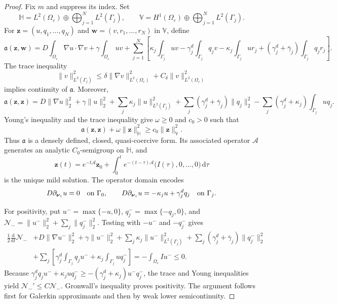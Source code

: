 \documentclass[pdflatex,sn-mathphys-num]{sn-jnl}
\numberwithin{equation}{section}
\theoremstyle{thmstyleone}%
\theoremstyle{definition}
\theoremstyle{remark}
\begin{document}
\begin{appendices}
\begin{proof}
Fix $m$ and suppress its index. Set
\[
\mathbb H=L^2(\Omega_\varepsilon)\oplus
\bigoplus_{j=1}^N L^2(\Gamma_j),\qquad
\mathbb V=H^1(\Omega_\varepsilon)\oplus
\bigoplus_{j=1}^N L^2(\Gamma_j).
\]
For $\mathbf z=(u,q_1,\ldots,q_N)$ and
$\mathbf w=(v,r_1,\ldots,r_N)$ in $\mathbb V$, define
\begin{equation}
\mathfrak a(\mathbf z,\mathbf w)
=D\int_{\Omega_\varepsilon}\nabla u\cdot\nabla v
+\gamma\int_{\Omega_\varepsilon}uv +\sum_{j=1}^N\left[
\kappa_j\int_{\Gamma_j}uv
-\gamma^d_j\int_{\Gamma_j}q_jv
-\kappa_j\int_{\Gamma_j}ur_j
+(\gamma^d_j+\bar\gamma_j)\int_{\Gamma_j}q_jr_j
\right].
\label{eq:appendix_form}
\end{equation}
The trace inequality
\[
\|v\|_{L^2(\Gamma_j)}^2
\leq \delta\|\nabla v\|_{L^2(\Omega_\varepsilon)}^2
+C_\delta\|v\|_{L^2(\Omega_\varepsilon)}^2
\]
implies continuity of $\mathfrak a$. Moreover,
\begin{equation}
\mathfrak a(\mathbf z,\mathbf z)
=D\|\nabla u\|_2^2+\gamma\|u\|_2^2
+\sum_j\kappa_j\|u\|_{L^2(\Gamma_j)}^2
+\sum_j(\gamma^d_j+\bar\gamma_j)\|q_j\|_2^2 -\sum_j(\gamma^d_j+\kappa_j)\int_{\Gamma_j}u q_j.
\end{equation}
Young's inequality and the trace inequality give $\omega\geq0$ and $c_0>0$
such that
\[
\mathfrak a(\mathbf z,\mathbf z)+\omega\|\mathbf z\|_{\mathbb H}^2
\geq c_0\|\mathbf z\|_{\mathbb V}^2.
\]
Thus $\mathfrak a$ is a densely defined, closed, quasi-coercive form. Its
associated operator $\mathcal A$ generates an analytic $C_0$-semigroup on
$\mathbb H$, and
\begin{equation}
\mathbf z(t)=e^{-t\mathcal A}\mathbf z_0+
\int_0^t e^{-(t-\tau)\mathcal A}
\bigl(I(\tau),0,\ldots,0\bigr)\,\mathrm d\tau
\label{eq:appendix_mild}
\end{equation}
is the unique mild solution. The operator domain encodes
\[
D\partial_{\boldsymbol\nu_\varepsilon}u=0\quad\hbox{on }\Gamma_0,
\qquad
D\partial_{\boldsymbol\nu_\varepsilon}u=-\kappa_j u+\gamma^d_jq_j
\quad\hbox{on }\Gamma_j.
\]

For positivity, put $u^-=\max\{-u,0\}$,
$q_j^-=\max\{-q_j,0\}$, and
$\mathcal N_-=\|u^-\|_2^2+\sum_j\|q_j^-\|_2^2$. Testing with
$-u^-$ and $-q_j^-$ gives
\begin{align}
\frac12\frac{\mathrm d}{\mathrm dt}\mathcal N_-
&+D\|\nabla u^-\|_2^2+\gamma\|u^-\|_2^2
+\sum_j\kappa_j\|u^-\|_{L^2(\Gamma_j)}^2
+\sum_j(\gamma^d_j+\bar\gamma_j)\|q_j^-\|_2^2 \nonumber\\
&+\sum_j\left[
\gamma^d_j\int_{\Gamma_j}q_j u^-
+\kappa_j\int_{\Gamma_j}u q_j^-
\right]
=-\int_{\Omega_\varepsilon}Iu^-\leq0.
\label{eq:appendix_negative}
\end{align}
Because
$\gamma^d_jq_ju^-+\kappa_juq_j^-
\geq-(\gamma^d_j+\kappa_j)u^-q_j^-$, the trace and Young inequalities yield
$\mathcal N_-'\leq C\mathcal N_-$. Gronwall's inequality proves positivity.
The argument follows first for Galerkin approximants and then by weak lower
semicontinuity.
\end{proof}


\end{appendices}
\end{document}
